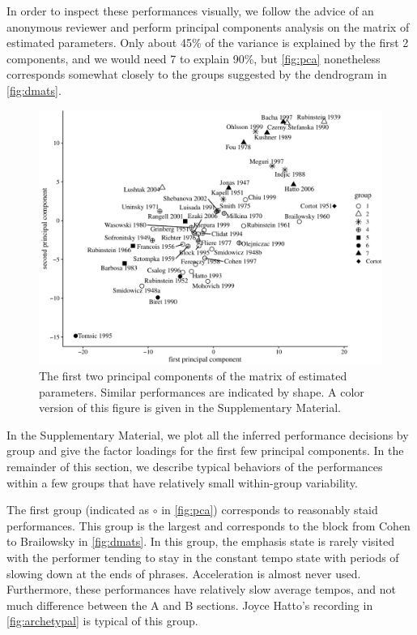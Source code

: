 \documentclass[aoas]{imsart}
\begin{document}
In order to inspect these performances visually, we follow the advice
of an anonymous reviewer and perform principal components analysis on
the matrix of estimated parameters. Only about 45\% of the variance is
explained by the first 2 components, and we would need 7 to explain
90\%, but \autoref{fig:pca} nonetheless corresponds somewhat closely
to the groups suggested by the dendrogram in \autoref{fig:dmats}.
\begin{figure}[t]
  \centering
  \includegraphics[width=\linewidth]{lin-principal-components-1}
  \caption{The first two principal components of the matrix of
    estimated parameters. Similar performances are indicated by
    shape. A color version of this figure is given in the Supplementary
    Material.}
  \label{fig:pca}
\end{figure}
In the Supplementary Material, we plot all the
inferred performance decisions by group and give the
factor loadings for the first few principal components. In the
remainder of this section, we describe
typical behaviors of the performances within a few groups that have relatively
small 
within-group variability.

The first group (indicated as $\circ$ in \autoref{fig:pca}) corresponds to
reasonably staid performances. This group is the largest and
corresponds to the block from Cohen to Brailowsky in
\autoref{fig:dmats}. In this group, the emphasis state is rarely visited
with the performer tending to stay in the constant tempo state with
periods of slowing down at the ends of phrases. Acceleration is almost never used. Furthermore, these
performances have relatively slow average tempos, and not much
difference between the A and B sections. Joyce Hatto's recording
in \autoref{fig:archetypal} is typical of this group.
\end{document}
